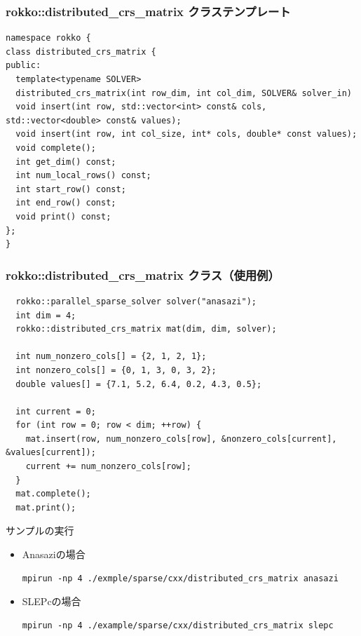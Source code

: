 \begin{frame}[c,fragile]
  \frametitle{rokko::distributed_crs_matrix クラステンプレート}
\begin{lstlisting}
namespace rokko {
class distributed_crs_matrix {
public:
  template<typename SOLVER>
  distributed_crs_matrix(int row_dim, int col_dim, SOLVER& solver_in)
  void insert(int row, std::vector<int> const& cols, std::vector<double> const& values);
  void insert(int row, int col_size, int* cols, double* const values);
  void complete();
  int get_dim() const;
  int num_local_rows() const;
  int start_row() const;
  int end_row() const;
  void print() const;
};
}
\end{lstlisting}
\end{frame}


\begin{frame}[c,fragile]
  \frametitle{rokko::distributed_crs_matrix クラス（使用例）
     }
\begin{lstlisting}
  rokko::parallel_sparse_solver solver("anasazi");
  int dim = 4;
  rokko::distributed_crs_matrix mat(dim, dim, solver);

  int num_nonzero_cols[] = {2, 1, 2, 1};
  int nonzero_cols[] = {0, 1, 3, 0, 3, 2};
  double values[] = {7.1, 5.2, 6.4, 0.2, 4.3, 0.5};

  int current = 0;
  for (int row = 0; row < dim; ++row) {
    mat.insert(row, num_nonzero_cols[row], &nonzero_cols[current], &values[current]);
    current += num_nonzero_cols[row]; 
  }
  mat.complete();
  mat.print();
\end{lstlisting}
\noindent
サンプルの実行
  \begin{itemize}
  \item Anasaziの場合
\begin{lstlisting}[style=shstyle]
mpirun -np 4 ./exmple/sparse/cxx/distributed_crs_matrix anasazi
\end{lstlisting}
  \item SLEPcの場合
\begin{lstlisting}[style=shstyle]
mpirun -np 4 ./example/sparse/cxx/distributed_crs_matrix slepc
\end{lstlisting}
  \end{itemize}
\end{frame}


